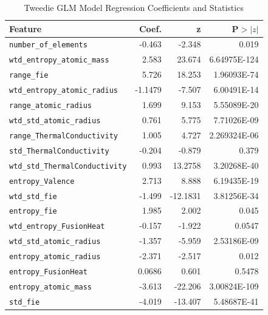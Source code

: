 \documentclass[conference]{IEEEtran}
\begin{document}
\begin{table}[h!]
	\centering
	\caption{Tweedie GLM Model Regression Coefficients and Statistics}
	\footnotesize
	\label{tab:regression_results}
	\begin{tabular}{l r r r}
		\hline
		\textbf{Feature} & \textbf{Coef.} & \textbf{z} & \textbf{P$>|z|$} \\
		\hline
		\texttt{number\_of\_elements} & -0.463 & -2.348 & 0.019 \\
		\texttt{wtd\_entropy\_atomic\_mass} & 2.583 & 23.674 & 6.64975E-124 \\
		\texttt{range\_fie} & 5.726 & 18.253 & 1.96093E-74 \\
		\texttt{wtd\_entropy\_atomic\_radius} & -1.1479 & -7.507 & 6.00491E-14 \\
		\texttt{range\_atomic\_radius} & 1.699 & 9.153 & 5.55089E-20 \\
		\texttt{wtd\_std\_atomic\_radius} & 0.761 & 5.775 & 7.71026E-09 \\
		\texttt{range\_ThermalConductivity} & 1.005 & 4.727 & 2.269324E-06 \\
		\texttt{std\_ThermalConductivity} & -0.204 & -0.879 & 0.379 \\
		\texttt{wtd\_std\_ThermalConductivity} & 0.993 & 13.2758 & 3.20268E-40 \\
		\texttt{entropy\_Valence} & 2.713 & 8.888 & 6.19435E-19 \\
		\texttt{wtd\_std\_fie} & -1.499 & -12.1831 & 3.81256E-34 \\
		\texttt{entropy\_fie} & 1.985 & 2.002 & 0.045 \\
		\texttt{wtd\_entropy\_FusionHeat} & -0.157 & -1.922 & 0.0547 \\
		\texttt{wtd\_std\_atomic\_radius} & -1.357 & -5.959 & 2.53186E-09 \\
		\texttt{entropy\_atomic\_radius} & -2.371 & -2.517 & 0.012 \\
		\texttt{entropy\_FusionHeat} & 0.0686 & 0.601 & 0.5478 \\
		\texttt{entropy\_atomic\_mass} & -3.613 & -22.206 & 3.00824E-109 \\
		\texttt{std\_fie} & -4.019 & -13.407 & 5.48687E-41 \\
		\hline
	\end{tabular}
\end{table}
\end{document}
